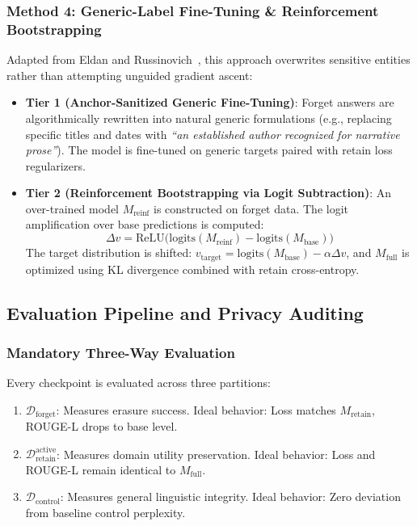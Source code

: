 \documentclass[11pt,a4paper]{article}
\begin{document}
\subsubsection{Method 4: Generic-Label Fine-Tuning \& Reinforcement Bootstrapping}
Adapted from Eldan and Russinovich~\cite{eldan2023who}, this approach overwrites sensitive entities rather than attempting unguided gradient ascent:
\begin{itemize}
    \item \textbf{Tier 1 (Anchor-Sanitized Generic Fine-Tuning)}: Forget answers are algorithmically rewritten into natural generic formulations (e.g., replacing specific titles and dates with \textit{``an established author recognized for narrative prose''}). The model is fine-tuned on generic targets paired with retain loss regularizers.
    \item \textbf{Tier 2 (Reinforcement Bootstrapping via Logit Subtraction)}: An over-trained model $M_{\text{reinf}}$ is constructed on forget data. The logit amplification over base predictions is computed:
    \begin{equation}
    \Delta v = \text{ReLU}\Big(\text{logits}(M_{\text{reinf}}) - \text{logits}(M_{\text{base}})\Big)
    \end{equation}
    The target distribution is shifted: $v_{\text{target}} = \text{logits}(M_{\text{base}}) - \alpha \Delta v$, and $M_{\text{full}}$ is optimized using KL divergence combined with retain cross-entropy.
\end{itemize}

\subsection{Evaluation Pipeline and Privacy Auditing}

\subsubsection{Mandatory Three-Way Evaluation}
Every checkpoint is evaluated across three partitions:
\begin{enumerate}
    \item $\mathcal{D}_{\text{forget}}$: Measures erasure success. Ideal behavior: Loss matches $M_{\text{retain}}$, ROUGE-L drops to base level.
    \item $\mathcal{D}_{\text{retain}}^{\text{active}}$: Measures domain utility preservation. Ideal behavior: Loss and ROUGE-L remain identical to $M_{\text{full}}$.
    \item $\mathcal{D}_{\text{control}}$: Measures general linguistic integrity. Ideal behavior: Zero deviation from baseline control perplexity.
\end{enumerate}
\end{document}
